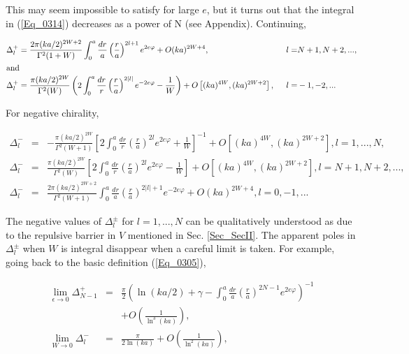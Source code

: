 \documentclass[a4paper,twocolumn,showpacs,preprintnumbers,amsmath,amssymb]{revtex4}
\begin{document}
\noindent
This may seem impossible to satisfy for large $e$, but it turns out
that the integral in (\ref{Eq_0314}) decreases as a power of N (see
Appendix). Continuing,

\begin{widetext}
\begin{alignat}{2}
\label{Eq_0315}
\Delta^{+}_l
  &= \frac{2\pi(ka/2)^{2W+2}}{\Gamma^2 (1+W)}
  \int^a_0 \frac{dr}{a} \left(\frac{r}{a}\right)^{2l+1}
  e^{2e \varphi} +  O(ka)^{2W+4},
  &l =& N+1, N+2, ...,\\ 
\intertext{and}
\label{Eq_0316}
\Delta^{+}_l
  &= \frac{\pi(ka/2)^{2W}}{\Gamma^2(W)}
  \left(
  2 \int^a_0 \frac{dr}{r} \left(\frac{r}{a}\right)^{2|l|}
  e^{-2e \varphi} - \frac{1}{W} \right)
  + O\left[(ka)^{4W}, (ka)^{2W+2}\right],
  \hspace{2mm}
  &l =& -1, -2, ...
\end{alignat}

\noindent
For negative chirality,

\begin{eqnarray}
\label{Eq_0317}
\Delta^{-}_l
  &=&
  - \frac{\pi(ka/2)^{2W}}{\Gamma^2(W+1)}
  \left[2 \int^a_0 \frac{dr}{r} \left(\frac{r}{a}\right)^{2l}
  e^{2e \varphi} + \frac{1}{W}\right]^{-1}
  + O\left[(ka)^{4W}, (ka)^{2W+2}\right], l = 1, ..., N,\\[7mm]
\label{Eq_0318}
\Delta^{-}_l
  &=&
  \frac{\pi(ka/2)^{2W}}{\Gamma^2(W)}
  \left[2 \int^a_0 \frac{dr}{r} \left(\frac{r}{a}\right)^{2l}
  e^{2e \varphi} - \frac{1}{W}\right]
  + O\left[(ka)^{4W}, (ka)^{2W+2}\right], l = N+1, N+2, ...,\\[7mm]
\label{Eq_0319}
\Delta^{-}_l
  &=&
  \frac{2\pi(ka/2)^{2W+2}}{\Gamma^2(W+1)}
  \int^a_0 \frac{dr}{a} \left(\frac{r}{a}\right)^{2|l|+1}
  e^{-2e \varphi} + O(ka)^{2W+4}, l = 0, -1, ...
\end{eqnarray}
\end{widetext}


The negative values of $\Delta^{\pm}_l$ for $l = 1, ... , N$ can be
qualitatively understood as due to the repulsive barrier in $V$
mentioned in Sec. \ref{Sec_SecII}. The apparent poles in
$\Delta^{\pm}_l$ when $W$ is integral disappear when a careful limit
is taken. For example, going back to the basic definition
(\ref{Eq_0305}),


\begin{eqnarray}
\label{Eq_0320}
\nonumber
\lim_{\epsilon \to 0} \Delta^{+}_{N-1}
  &=& \frac{\pi}{2} \left( \ln(ka/2) + \gamma
      - \int^a_0 \frac{dr}{a} \left(\frac{r}{a}\right)^{2N-1}
      e^{2e \varphi} \right)^{-1}\\
\nonumber
  & & + O\left(\frac{1}{\ln^3(ka)}\right),\\
\lim_{W \to 0} \Delta^{-}_l
  &=& \frac{\pi}{2 \ln(ka)} + O\left(\frac{1}{\ln^2(ka)}\right),
\end{eqnarray}
\end{document}
